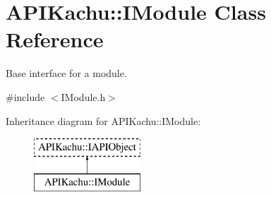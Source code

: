 \hypertarget{class_a_p_i_kachu_1_1_i_module}{}\section{A\+P\+I\+Kachu\+:\+:I\+Module Class Reference}
\label{class_a_p_i_kachu_1_1_i_module}


Base interface for a module.  




{\ttfamily \#include $<$I\+Module.\+h$>$}

Inheritance diagram for A\+P\+I\+Kachu\+:\+:I\+Module\+:\begin{figure}[H]
\begin{center}
\leavevmode
\includegraphics[height=2.000000cm]{class_a_p_i_kachu_1_1_i_module}
\end{center}
\end{figure}
